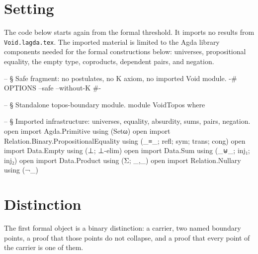 \documentclass[11pt]{article}
\begin{document}
\section{Setting}

The code below starts again from the formal threshold.  It imports no
results from \texttt{Void.lagda.tex}.  The imported material is limited
to the Agda library components needed for the formal constructions
below: universes, propositional equality, the empty type, coproducts,
dependent pairs, and negation.

\begin{code}
-- § Safe fragment: no postulates, no K axiom, no imported Void module.
{-# OPTIONS --safe --without-K #-}

-- § Standalone topos-boundary module.
module VoidTopos where

-- § Imported infrastructure: universes, equality, absurdity, sums, pairs, negation.
open import Agda.Primitive using (Setω)
open import Relation.Binary.PropositionalEquality using (_≡_; refl; sym; trans; cong)
open import Data.Empty using (⊥; ⊥-elim)
open import Data.Sum using (_⊎_; inj₁; inj₂)
open import Data.Product using (Σ; _,_)
open import Relation.Nullary using (¬_)
\end{code}

\section{Distinction}

The first formal object is a binary distinction: a carrier, two named
boundary points, a proof that those points do not collapse, and a proof
that every point of the carrier is one of them.
\end{document}
